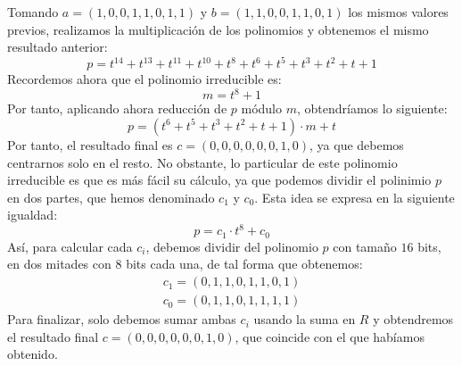     \begin{ejemplo} 
        Tomando $a = (1, 0, 0, 1, 1, 0, 1, 1)$ y $b = (1, 1, 0, 0, 1, 1, 0, 1)$ los mismos valores previos, realizamos la multiplicación de los polinomios y obtenemos el mismo resultado anterior:
        \begin{equation}
            p = t^{14} + t^{13} + t^{11} + t^{10} + t^{8} + t^{6} + t^{5} + t^{3} + t^{2} + t + 1
        \end{equation}
        Recordemos ahora que el polinomio irreducible es:
        \begin{equation}
            m = t^{8} + 1
        \end{equation}
        Por tanto, aplicando ahora reducción de $p$ módulo $m$, obtendríamos lo siguiente:
        \begin{equation}
            p = (t^{6} + t^{5} + t^{3} + t^{2} + t + 1) \cdot m + t 
        \end{equation}
        Por tanto, el resultado final es $c = (0, 0, 0, 0, 0, 0, 1, 0)$, ya que debemos centrarnos solo en el resto. No obstante, lo particular de este polinomio irreducible es que es más fácil su cálculo, ya que podemos dividir el polinimio $p$ en dos partes, que hemos denominado $c_{1}$ y $c_{0}$. Esta idea se expresa en la siguiente igualdad:
        \begin{equation}
            p = c_{1} \cdot t^{8} + c_{0}
        \end{equation}
        Así, para calcular cada $c_{i}$, debemos dividir del polinomio $p$ con tamaño $16$ bits, en dos mitades con $8$ bits cada una, de tal forma que obtenemos:
        \begin{align}
            c_{1} = (0, 1, 1, 0, 1, 1, 0, 1) \\
            c_{0} = (0, 1, 1, 0, 1, 1, 1, 1)
        \end{align}
        Para finalizar, solo debemos sumar ambas $c_{i}$ usando la suma en $R$ y obtendremos el resultado final $c = (0, 0, 0, 0, 0, 0, 1, 0)$, que coincide con el que habíamos obtenido.
    \end{ejemplo}
    
